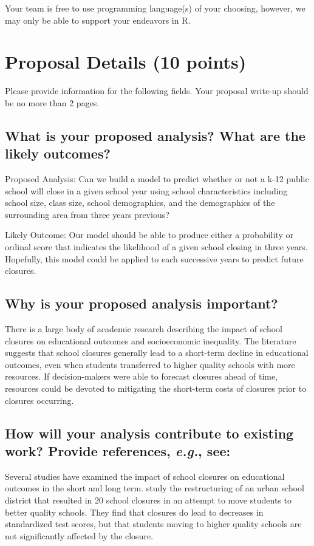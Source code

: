 \documentclass[twoside,11pt]{article}
\begin{document}
Your team is free to use programming language(s) of your choosing, however, we may only be able to support your endeavors in R.

\section{Proposal Details (10 points)} \label{details}
Please provide information for the following fields. Your proposal write-up should be no more than 2 pages.

\subsection{What is your proposed analysis? What are the likely outcomes?}

Proposed Analysis: Can we build a model to predict whether or not a k-12 public school will close in a given school year using school characteristics including school size, class size, school demographics, and the demographics of the surrounding area from three years previous?

Likely Outcome: Our model should be able to produce either a probability or ordinal score that indicates the likelihood of a given school closing in three years. Hopefully, this model could be applied to each successive years to predict future closures.



\subsection{Why is your proposed analysis important?}
There is a large body of academic research describing the impact of school closures on educational outcomes and socioeconomic inequality. The literature suggests that school closures generally lead to a short-term decline in educational outcomes, even when students transferred to higher quality schools with more resources. If decision-makers were able to forecast closures ahead of time, resources could be devoted to mitigating the short-term costs of closures prior to closures occurring.


\subsection{How will your analysis contribute to existing work? Provide references, \emph{e.g.}, see: \cite{cite1,cite2}}

Several studies have examined the impact of school closures on educational outcomes in the short and long term. \cite{cite1} study the restructuring of an urban school district that resulted in 20 school closures in an attempt to move students to better quality schools. They find that closures do lead to decreases in standardized test scores, but that students moving to higher quality schools are not significantly affected by the closure. 
\end{document}
